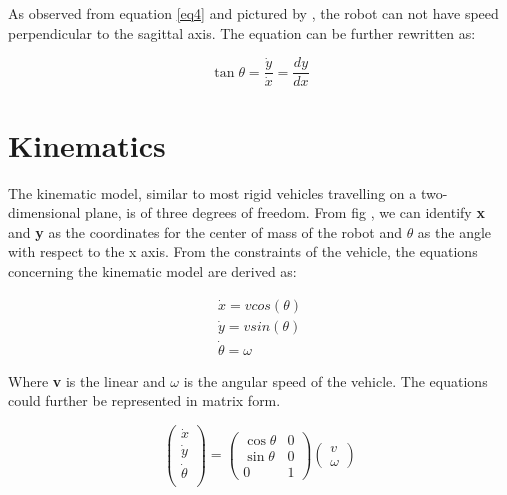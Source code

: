 As observed from equation \ref{eq4} and pictured by , the robot can not have speed perpendicular to the sagittal axis. The equation can be further rewritten as:

\begin{equation} \label{eq5} 
\tan{\theta} = \frac{\dot{y}}{\dot{x}} = \frac{dy}{dx}
\end{equation} 

\section{Kinematics} \label{kinematics}

The kinematic model, similar to most rigid vehicles travelling on a two-dimensional plane, is of three degrees of freedom. From fig , we can identify \textbf{x} and \textbf{y} as the coordinates for the center of mass of the robot and \textbf{$\theta$} as the angle with respect to the x axis. From the constraints of the vehicle, the equations concerning the kinematic model are derived as:

\begin{align}
\dot{x} = vcos(\theta) \nonumber \\
\dot{y} = vsin(\theta) \label{eq6} \\
\dot{\theta} = \omega  \nonumber 
\end{align}

Where \textbf{v} is the linear and \textbf{$\omega$} is the angular speed of the vehicle.
The equations could further be represented in matrix form.

\begin{equation} \label{eq7} 
\begin{pmatrix}
	\dot{x} \\
	\dot{y} \\
	\dot{\theta} \\ 
\end{pmatrix} 
=
\begin{pmatrix} 
	\cos{\theta} & 0 \\
	\sin{\theta} & 0 \\
	0     		 & 1  
\end{pmatrix}
\begin{pmatrix}
	v \\
	\omega
\end{pmatrix}  	
\end{equation}



